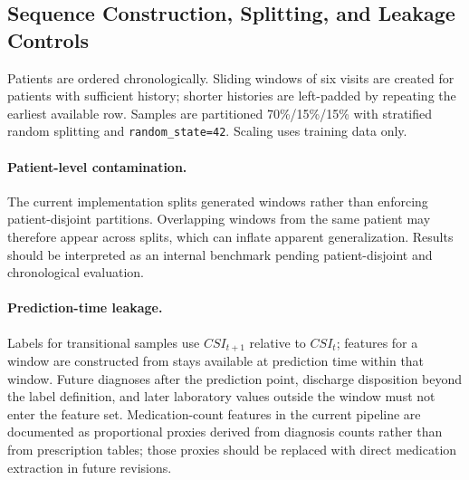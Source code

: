 \documentclass[conference]{IEEEtran}
\begin{document}
\subsection{Sequence Construction, Splitting, and Leakage Controls}
Patients are ordered chronologically. Sliding windows of six visits are created for patients with sufficient history; shorter histories are left-padded by repeating the earliest available row. Samples are partitioned 70\%/15\%/15\% with stratified random splitting and \texttt{random\_state=42}. Scaling uses training data only.

\paragraph{Patient-level contamination.}
The current implementation splits generated windows rather than enforcing patient-disjoint partitions. Overlapping windows from the same patient may therefore appear across splits, which can inflate apparent generalization. Results should be interpreted as an internal benchmark pending patient-disjoint and chronological evaluation.

\paragraph{Prediction-time leakage.}
Labels for transitional samples use $CSI_{t+1}$ relative to $CSI_t$; features for a window are constructed from stays available at prediction time within that window. Future diagnoses after the prediction point, discharge disposition beyond the label definition, and later laboratory values outside the window must not enter the feature set. Medication-count features in the current pipeline are documented as proportional proxies derived from diagnosis counts rather than from prescription tables; those proxies should be replaced with direct medication extraction in future revisions.
\end{document}
